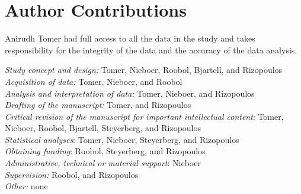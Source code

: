 \section*{Author Contributions}
Anirudh Tomer had full access to all the data in the study and takes responsibility for the integrity of the data and the accuracy of the data analysis.

\noindent\textit{Study concept and design:} Tomer, Nieboer, Roobol, Bjartell, and Rizopoulos\\
\textit{Acquisition of data:} Tomer, Nieboer, and Roobol\\
\textit{Analysis and interpretation of data:} Tomer, Nieboer, and Rizopoulos\\
\textit{Drafting of the manuscript:} Tomer, and Rizopoulos\\
\textit{Critical revision of the manuscript for important intellectual content}: Tomer, Nieboer, Roobol, Bjartell, Steyerberg, and Rizopoulos\\
\textit{Statistical analyses}: Tomer, Nieboer, Steyerberg, and Rizopoulos\\
\textit{Obtaining funding}: Roobol, Steyerberg, and Rizopoulos\\
\textit{Administrative, technical or material support}: Nieboer\\
\textit{Supervision:} Roobol, and Rizopoulos\\
\textit{Other:} none